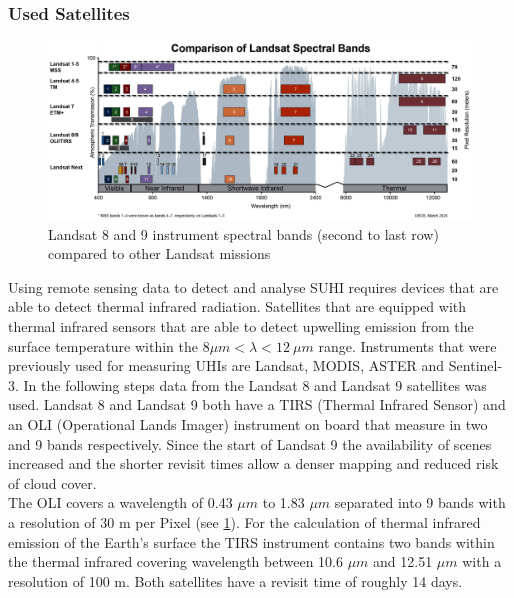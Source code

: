 \documentclass[12pt,a4paper, english]{article}
\begin{document}
    \subsubsection{Used Satellites}\label{sec:landsat}
      \begin{figure}[htbp]
       \begin{center}
         \includegraphics[width=\textwidth]{img/LandsatSpectralBands.png}
       \end{center}
       \caption{Landsat 8 and 9 instrument spectral bands (second to last row) compared to other Landsat missions\autocite{USGSWebsite}\label{fig:lsspectral}}
      \end{figure}
      \noindent
      Using remote sensing data to detect and analyse \gls{SUHI} requires devices that are able to detect thermal infrared radiation. 
      Satellites that are equipped with thermal infrared sensors that are able to detect upwelling emission from the surface temperature within the $ 8\mu m < \lambda < 12\ \mu m $ range. 
      Instruments that were previously used for measuring \glspl{UHI} are Landsat, MODIS, ASTER and Sentinel-3. 
      In the following steps data from the Landsat 8 and Landsat 9 satellites was used.%
      Landsat 8 and Landsat 9 both have a TIRS (Thermal Infrared Sensor) and an OLI (Operational Lands Imager) instrument on board that measure in two and 9 bands respectively.
      Since the start of Landsat 9 the availability of scenes increased and the shorter revisit times allow a denser mapping and reduced risk of cloud cover. \\ 
      The OLI covers a wavelength of 0.43 $\mu m$ to 1.83 $\mu m$ separated into 9 bands with a resolution of 30 m per Pixel (see \cref{fig:lsspectral}). 
      For the calculation of thermal infrared emission of the Earth's surface the TIRS instrument contains two bands within the thermal infrared covering wavelength between 10.6 $\mu m$ and 12.51 $\mu m$ with a resolution of 100 m.
      Both satellites have a revisit time of roughly 14 days. 
\end{document}
